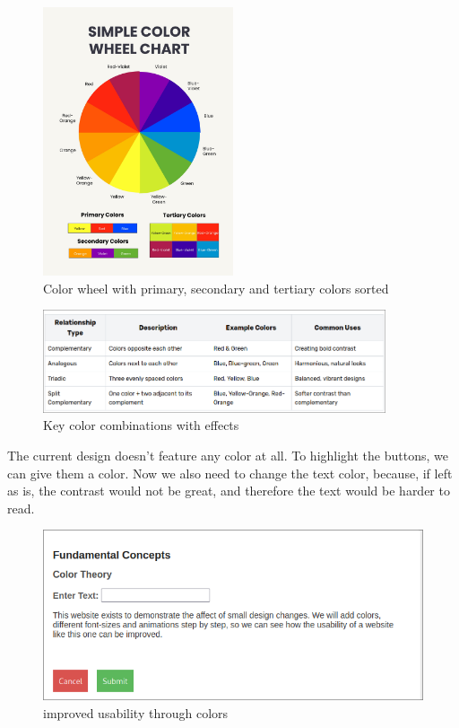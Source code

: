 \begin{figure} [H]
    \center
    \includegraphics [width=0.5\textwidth] {images/paul/colorWheel.jpg}
    \caption{Color wheel with primary, secondary and tertiary colors sorted \autocite{ColorWheel:Img}}
\end{figure}

\begin{figure} [H]
    \centering
    \includegraphics [width=0.9\textwidth] {images/paul/colorRelations.png}
    \caption{Key color combinations with effects \autocite{ColorCombinations:Img}}
\end{figure}

\newpage

The current design doesn't feature any color at all. To highlight the buttons, we can give them a color. Now we also need to change the text color, because, if left as is, the contrast would not be great, and therefore the text would be harder to read. \autocite{Paul:ColorTheoryForBeginners}
    
    \begin{figure} [H]
        \center
        \includegraphics [width=1\textwidth] {images/paul/usabilityExamples/ColorTheoryExample.png}
        \caption{improved usability through colors}
    \end{figure}

